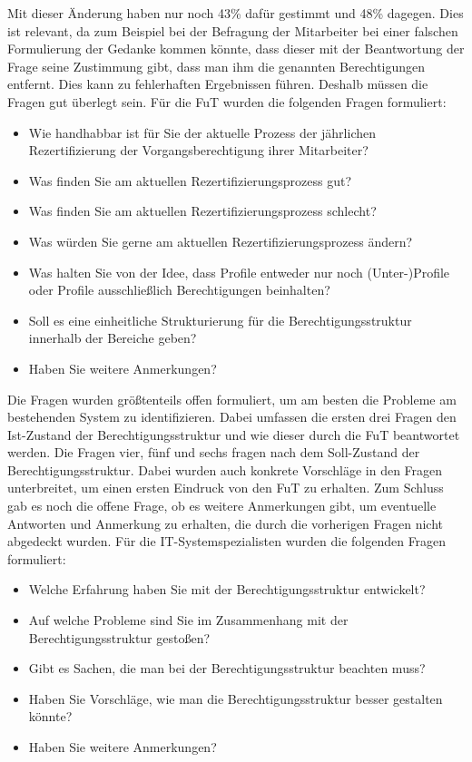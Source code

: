 Mit dieser Änderung haben nur noch 43\% dafür gestimmt und 48\% dagegen. \cite{Survey}
\newline
Dies ist relevant, da zum Beispiel bei der Befragung der Mitarbeiter bei einer falschen Formulierung der Gedanke kommen könnte, dass dieser mit der Beantwortung der Frage seine Zustimmung gibt, dass man ihm die genannten Berechtigungen entfernt.
Dies kann zu fehlerhaften Ergebnissen führen.
Deshalb müssen die Fragen gut überlegt sein.
\newline
\newline
Für die \ac{FuT} wurden die folgenden Fragen formuliert: 
\begin{itemize}
	\item Wie handhabbar ist für Sie der aktuelle Prozess der jährlichen Rezertifizierung der Vorgangsberechtigung ihrer Mitarbeiter?
	\item Was finden Sie am aktuellen Rezertifizierungsprozess gut?
	\item Was finden Sie am aktuellen Rezertifizierungsprozess schlecht?
	\item Was würden Sie gerne am aktuellen Rezertifizierungsprozess ändern?
	\item Was halten Sie von der Idee, dass Profile entweder nur noch (Unter-)Profile oder Profile ausschließlich Berechtigungen beinhalten?
	\item Soll es eine einheitliche Strukturierung für die Berechtigungsstruktur innerhalb der Bereiche geben?
	\item Haben Sie weitere Anmerkungen?
\end{itemize}
Die Fragen wurden größtenteils offen formuliert, um am besten die Probleme am bestehenden System zu identifizieren.
Dabei umfassen die ersten drei Fragen den Ist-Zustand der Berechtigungsstruktur und wie dieser durch die \ac{FuT} beantwortet werden.
Die Fragen vier, fünf und sechs fragen nach dem Soll-Zustand der Berechtigungsstruktur.
Dabei wurden auch konkrete Vorschläge in den Fragen unterbreitet, um einen ersten Eindruck von den \ac{FuT} zu erhalten.
Zum Schluss gab es noch die offene Frage, ob es weitere Anmerkungen gibt, um eventuelle Antworten und Anmerkung zu erhalten, die durch die vorherigen Fragen nicht abgedeckt wurden.
\newline
\newline
Für die IT-Systemspezialisten wurden die folgenden Fragen formuliert: 
\begin{itemize}
	\item Welche Erfahrung haben Sie mit der Berechtigungsstruktur entwickelt?
	\item Auf welche Probleme sind Sie im Zusammenhang mit der Berechtigungsstruktur gestoßen?
	\item Gibt es Sachen, die man bei der Berechtigungsstruktur beachten muss?
	\item Haben Sie Vorschläge, wie man die Berechtigungsstruktur besser gestalten könnte?
	\item Haben Sie weitere Anmerkungen?
\end{itemize}
